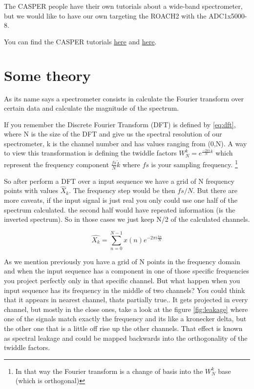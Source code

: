 The CASPER people have their own tutorials about a wide-band spectrometer, but we would like to have our own targeting the ROACH2 with the ADC1x5000-8. 

 You can find the CASPER tutorials \href{https://casper.astro.berkeley.edu/wiki/Wideband_Spectrometer}{here} and \href{https://casper-toolflow.readthedocs.io/projects/tutorials/en/latest/tutorials/snap/tut_spec.html}{here}.
 
 
 \section{Some theory}
 As its name says a spectrometer consists in calculate the Fourier transform over certain data and calculate the magnitude of the spectrum.
 
 If you remember the Discrete Fourier Transform (DFT) is defined by \ref{eq:dft}, where N is the size of the DFT and give us the spectral resolution of our spectrometer, k is the channel number and has values ranging from (0,N). 
 A way to view this transformation is defining the twiddle factors $W_{N}^k = e^{\frac{-2\pi i}{N}k}$ which represent the frequency component $\frac{fs}{N}\dot k$ where $fs$ is your sampling frequency. \footnote{In that way the Fourier transform is a change of basis into the $W_{N}^{k}$ base (which is orthogonal)}

So after perform a DFT over a input sequence we have a grid of N frequency points with values $\hat{X}_{k}$. The frequency step would be then $fs/N$.
But there are more caveats, if the input signal is just real you only could use one half of the spectrum calculated. the second half would have repeated information (is the inverted spectrum). So in those cases we just keep N/2 of the calculated channels.
 
 \begin{equation}
     \hat{X_{k}} = \sum_{n=0}^{N-1}x(n)e^{-2\pi i\frac{kn}{N}}
     \label{eq:dft}
 \end{equation}
 
 
 As we mention previously you have a grid of N points in the frequency domain and when the input sequence has a component in one of those specific frequencies you project perfectly only in that specific channel. But what happen when you input sequence has its frequency in the middle of two channels? You could think that it appears in nearest channel, thats partially true.. It gets projected in every channel, but mostly in the close ones, take a look at the figure \ref{fig:leakage} where one of the signals match exactly the frequency and its like a kronecker delta, but the other one that is a little off rise up the other channels. That effect is known as spectral leakage and could be mapped backwards into the orthogonality of the twiddle factors.
 

